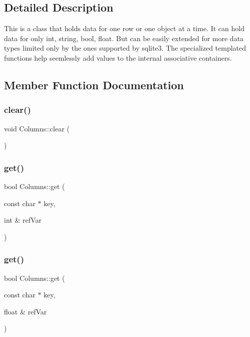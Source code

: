 \subsection{Detailed Description}
This is a class that holds data for one row or one object at a time. It can hold data for only int, string, bool, float. But can be easily extended for more data types limited only by the ones supported by sqlite3. The specialized templated functions help seemlessly add values to the internal associative containers. 

\subsection{Member Function Documentation}
\mbox{\label{classColumns_a47d00e2daee2c85a40952509a542a911}} 
\subsubsection{\texorpdfstring{clear()}{clear()}}
{\footnotesize\ttfamily void Columns\+::clear (\begin{DoxyParamCaption}{ }\end{DoxyParamCaption})\hspace{0.3cm}{\ttfamily [inline]}}

\mbox{\label{classColumns_a4467704e26d0899a5873df4a28978cd2}} 
\subsubsection{\texorpdfstring{get()}{get()}\hspace{0.1cm}{\footnotesize\ttfamily [1/4]}}
{\footnotesize\ttfamily bool Columns\+::get (\begin{DoxyParamCaption}\item[{const char $\ast$}]{key,  }\item[{int \&}]{ref\+Var }\end{DoxyParamCaption})}

\mbox{\label{classColumns_acc2d0655f5329b618cdb31c844214daa}} 
\subsubsection{\texorpdfstring{get()}{get()}\hspace{0.1cm}{\footnotesize\ttfamily [2/4]}}
{\footnotesize\ttfamily bool Columns\+::get (\begin{DoxyParamCaption}\item[{const char $\ast$}]{key,  }\item[{float \&}]{ref\+Var }\end{DoxyParamCaption})}

